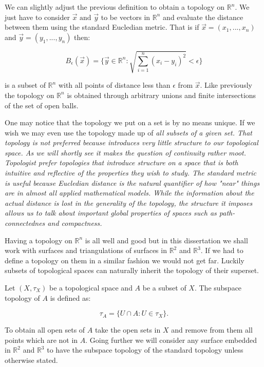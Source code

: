 We can slightly adjust the previous definition to obtain a topology on $\mathbb{R}^n$. We just have to consider $\vec{x} \text{ and } \vec{y}$ to be vectors in $\mathbb{R}^n$ and evaluate the distance between them using the standard Eucledian metric. That is if $\vec{x} = (x_1, ..., x_n)$ and $\vec{y} = (y_1, ..., y_n)$ then:

$$ B_\epsilon(\vec{x}) = \{\vec{y} \in \mathbb{R}^n : \sqrt{\sum_{i = 1}^{n}{(x_i - y_i) ^ 2}} < \epsilon \} $$

is a subset of $\mathbb{R}^n$ with all points of distance less than $\epsilon$ from $\vec{x}$. Like previously the topology on $\mathbb{R}^n$ is obtained through arbitrary unions and finite intersections of the set of open balls.


One may notice that the topology we put on a set is by no means unique. If we wish we may even use the topology made up of \em all \em subsets of a given set. That topology is not preferred because introduces very little structure to our topological space. As we will shortly see it makes the question of continuity rather moot. Topologist prefer topologies that introduce structure on a space that is both intuitive and reflective of the properties they wish to study. The standard metric is useful because Eucledian distance is the natural quantifier of how "near" things are in almost all applied mathematical models. While the information about the actual distance is lost in the generality of the topology, the structure it imposes allows us to talk about important global properties of spaces such as path-connectednes and compactness.

Having a topology on $\mathbb{R}^n$ is all well and good but in this dissertation we shall work with surfaces and triangulations of surfaces in $\mathbb{R}^2$ and $\mathbb{R}^3$. If we had to define a topology on them in a similar fashion we would not get far. Luckily subsets of topological spaces can naturally inherit the topology of their superset.

\begin{defn} Let $(X, \tau_X)$ be a topological space and $A$ be a subset of $X$. The subspace topology of $A$ is defined as: \end{defn}

$$ \tau_A = \{U \cap A: U \in \tau_X\}.$$

To obtain all open sets of $A$ take the open sets in $X$ and remove from them all points which are not in $A$. Going further we will consider any surface embedded in $\mathbb{R}^2$ and $\mathbb{R}^3$ to have the subspace topology of the standard topology unless otherwise stated.

